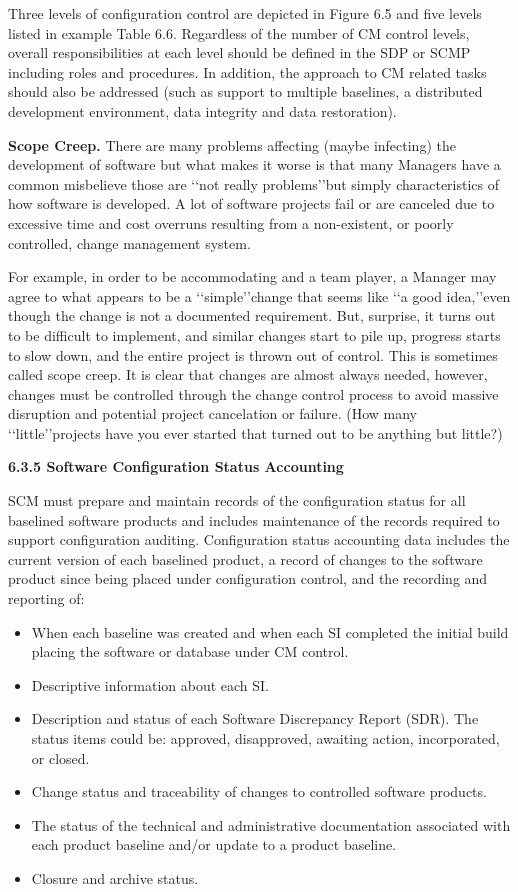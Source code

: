 \documentclass[8pt,twocolumn]{amsart}
\theoremstyle{plain}
\begin{document}
Three levels of configuration control are depicted in Figure 6.5 and five levels listed in example Table 6.6. Regardless of the number of CM control levels, overall responsibilities at each level should be defined in the SDP or SCMP including roles and procedures. In addition, the approach to CM related tasks should also be addressed (such as support to multiple baselines, a distributed development environment, data integrity and data restoration).


{\bf Scope Creep.} There are many problems affecting (maybe infecting) the development of software but what makes it worse is that many Managers have a common misbelieve those are \lq\lq not really problems\rq\rq but simply characteristics of how software is developed. A lot of software projects fail or are canceled due to excessive time and cost overruns resulting from a non-existent, or poorly controlled, change management system.


For example, in order to be accommodating and a team player, a Manager may agree to what appears to be a \lq\lq simple\rq\rq change that seems like \lq\lq a good idea,\rq\rq even though the change is not a documented requirement. But, surprise, it turns out to be difficult to implement, and similar changes start to pile
up, progress starts to slow down, and the entire project is thrown out of control. This is sometimes called scope creep. It is clear that changes are almost always needed, however, changes must be controlled through the change control process to avoid massive disruption and potential project cancelation
or failure. (How many \lq\lq little\rq\rq projects have you ever started that turned out to be anything but little?)

{\bf 6.3.5 Software Configuration Status Accounting}

SCM must prepare and maintain records of the configuration status for all baselined software products and includes maintenance of the records required to support configuration auditing. Configuration status accounting data includes the current version of each baselined product, a record of changes to the software product since being placed under configuration control, and the recording and reporting of:
\begin{itemize}
\item When each baseline was created and when each SI completed the initial build placing the software or database under CM control.
\item Descriptive information about each SI.
\item Description and status of each Software Discrepancy Report (SDR). The status items could be: approved, disapproved, awaiting action, incorporated, or closed.
\item Change status and traceability of changes to controlled software products.
\item The status of the technical and administrative documentation associated with each product baseline and/or update to a product baseline.
\item Closure and archive status.
\end{itemize}
\end{document}
